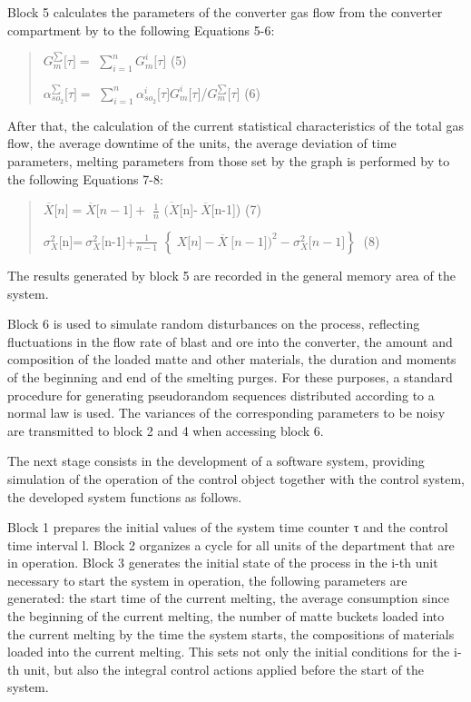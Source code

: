 Block 5 calculates the parameters of the converter gas flow from the
converter compartment by to the following Equations 5-6:

\begin{quote}
\(G_{m}^{\sum}\lbrack\tau\rbrack =\)
\(\sum_{i = 1}^{n}G_{m}^{i}\lbrack\tau\rbrack\) (5)

\(\alpha_{{so}_{2}}^{\sum}\lbrack\tau\rbrack =\)
\(\sum_{i = 1}^{n}\alpha_{{so}_{2}}^{i}\lbrack\tau\rbrack G_{m}^{i}\lbrack\tau\rbrack\)/\(G_{m}^{\sum}\lbrack\tau\rbrack\)
(6)
\end{quote}

After that, the calculation of the current statistical characteristics
of the total gas flow, the average downtime of the units, the average
deviation of time parameters, melting parameters from those set by the
graph is performed by to the following Equations 7-8:

\begin{quote}
\(\overline{X}\lbrack n\rbrack = \overline{X}\lbrack n - 1\rbrack +\)
\(\frac{1}{n}\) \(\overline{(X}\){[}n{]}-\(\ \overline{X}\){[}n-1{]})
(7)

\(\sigma_{X}^{2}\){[}n{]}=\(\ \sigma_{X}^{2}\){[}n-1{]}+\(\frac{1}{n - 1}\)
\(\left\{ \ X\lbrack n\rbrack - \overline{X}\ \lbrack n - 1\rbrack)^{2} - \sigma_{X}^{2}\lbrack n - 1\rbrack \right\}\ \)
(8)
\end{quote}

The results generated by block 5 are recorded in the general memory area
of the system.

Block 6 is used to simulate random disturbances on the process,
reflecting fluctuations in the flow rate of blast and ore into the
converter, the amount and composition of the loaded matte and other
materials, the duration and moments of the beginning and end of the
smelting purges. For these purposes, a standard procedure for generating
pseudorandom sequences distributed according to a normal law is used.
The variances of the corresponding parameters to be noisy are
transmitted to block 2 and 4 when accessing block 6.

The next stage consists in the development of a software system,
providing simulation of the operation of the control object together
with the control system, the developed system functions as follows.

Block 1 prepares the initial values of the system time counter τ and the
control time interval l. Block 2 organizes a cycle for all units of the
department that are in operation. Block 3 generates the initial state of
the process in the i-th unit necessary to start the system in operation,
the following parameters are generated: the start time of the current
melting, the average consumption since the beginning of the current
melting, the number of matte buckets loaded into the current melting by
the time the system starts, the compositions of materials loaded into
the current melting. This sets not only the initial conditions for the
i-th unit, but also the integral control actions applied before the
start of the system.

